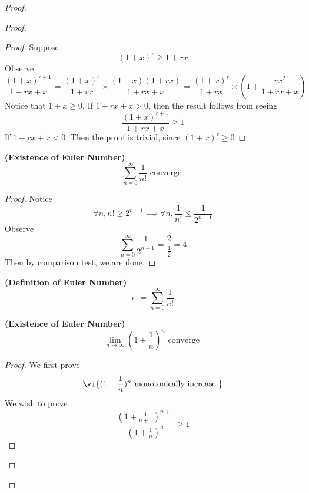 \documentclass{report}
\begin{document}
\begin{proof}
\begin{proof}
\begin{proof}
Suppose 
\begin{equation*}
  (1+x)^r\geq 1+rx
\end{equation*} 
Observe
\begin{equation*}
  \frac{(1+x)^{r+1}}{1+rx+x}=\frac{(1+x)^r}{1+rx}\times \frac{(1+x)(1+rx)}{1+rx+x}=\frac{(1+x)^r}{1+rx}\times (1+\frac{rx^2}{1+rx+x})
\end{equation*}
Notice that $1+x\geq 0$. If $1+rx+x>0$, then the result follows from seeing 
\begin{equation*}
\frac{(1+x)^{r+1}}{1+rx+x}\geq 1
\end{equation*}
If $1+rx+x<0$. Then the proof is trivial, since $(1+x)^r\geq 0$ 
\end{proof}
\begin{theorem}
\label{4.5.2}
\textbf{(Existence of Euler Number)} 
\begin{equation*}
\sum_{n=0}^\infty \frac{1}{n!}\text{ converge }
\end{equation*}
\end{theorem}
\begin{proof}
Notice 
\begin{equation*}
\forall n, n!\geq 2^{n-1}\implies \forall n,\frac{1}{n!}\leq \frac{1}{2^{n-1}}
\end{equation*}
Observe 
\begin{equation*}
\sum_{n=0}^\infty  \frac{1}{2^{n-1}}=\frac{2}{\frac{1}{2}}=4
\end{equation*}
Then by comparison test, we are done. 
\end{proof}
\begin{definition}
\label{4.5.3}
\textbf{(Definition of Euler Number)}
\begin{equation*}
e:=\sum_{n=0}^\infty \frac{1}{n!}
\end{equation*}
\end{definition}
\begin{theorem}
\label{4.5.4}
\textbf{(Existence of Euler Number)}
\begin{equation*}
\lim_{n\to\infty} (1+\frac{1}{n})^n\text{ converge }
\end{equation*}
\end{theorem}
\begin{proof}
We first prove
\begin{equation*}
\vi{(1+\frac{1}{n})^n\text{ monotonically increase }}
\end{equation*}
We wish to prove
\begin{equation*}
\frac{(1+\frac{1}{n+1})^{n+1}}{(1+\frac{1}{n})^n}\geq 1

\end{equation*}
\end{proof}
\end{proof}
\end{proof}
\end{document}
